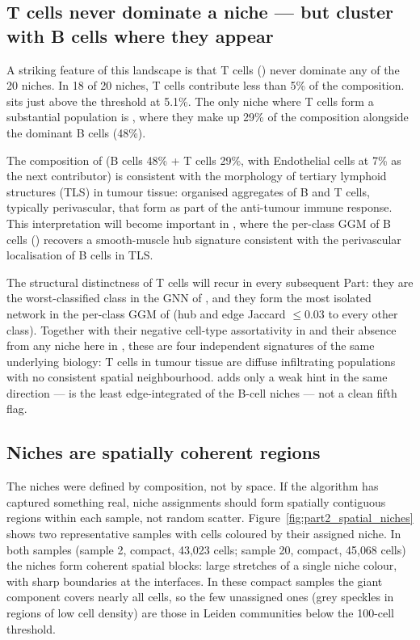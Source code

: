 \subsection*{T cells never dominate a niche --- but cluster with B cells where they appear}

A striking feature of this landscape is that T cells () never dominate any of the 20 niches. In 18 of 20 niches, T cells contribute less than 5\% of the composition.  sits just above the threshold at 5.1\%. The only niche where T cells form a substantial population is , where they make up 29\% of the composition alongside the dominant B cells (48\%).

The composition of  (B cells 48\% + T cells 29\%, with Endothelial cells at 7\% as the next contributor) is consistent with the morphology of tertiary lymphoid structures (TLS) in tumour tissue: organised aggregates of B and T cells, typically perivascular, that form as part of the anti-tumour immune response. This interpretation will become important in , where the per-class GGM of B cells () recovers a smooth-muscle hub signature consistent with the perivascular localisation of B cells in TLS.

The structural distinctness of T cells will recur in every subsequent Part: they are the worst-classified class in the GNN of , and they form the most isolated network in the per-class GGM of  (hub and edge Jaccard $\leq 0.03$ to every other class). Together with their negative cell-type assortativity in  and their absence from any niche here in , these are four independent signatures of the same underlying biology: T cells in tumour tissue are diffuse infiltrating populations with no consistent spatial neighbourhood.  adds only a weak hint in the same direction ---  is the least edge-integrated of the B-cell niches --- not a clean fifth flag.

\subsection*{Niches are spatially coherent regions}

The niches were defined by composition, not by space. If the algorithm has captured something real, niche assignments should form spatially contiguous regions within each sample, not random scatter. Figure~\ref{fig:part2_spatial_niches} shows two representative samples with cells coloured by their assigned niche. In both samples (sample 2, compact, 43{,}023 cells; sample 20, compact, 45{,}068 cells) the niches form coherent spatial blocks: large stretches of a single niche colour, with sharp boundaries at the interfaces. In these compact samples the giant component covers nearly all cells, so the few unassigned ones (grey speckles in regions of low cell density) are those in Leiden communities below the 100-cell threshold.


